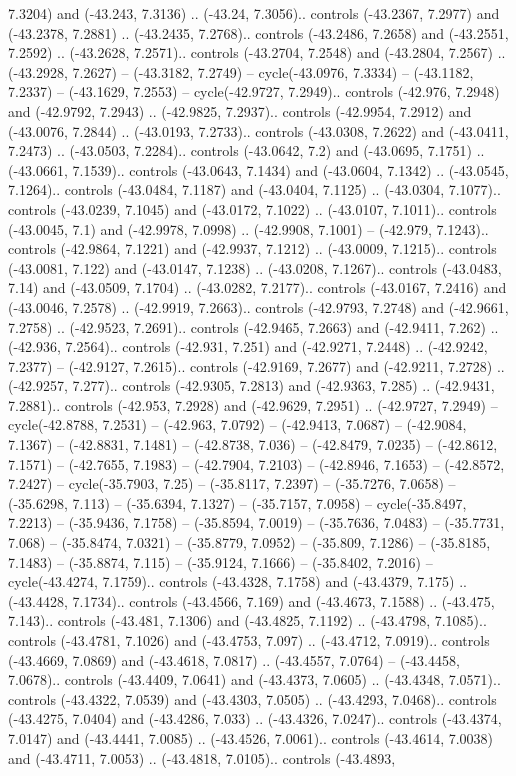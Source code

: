 \begin{scope}[shift={(2.5552, 9.9912)}]
\begin{scope}[shift={(48.1654, -14.8546)}]
7.3204) and (-43.243, 7.3136) .. (-43.24, 7.3056).. controls (-43.2367, 7.2977) and (-43.2378, 7.2881) .. (-43.2435, 7.2768).. controls (-43.2486, 7.2658) and (-43.2551, 7.2592) .. (-43.2628, 7.2571).. controls (-43.2704, 7.2548) and (-43.2804, 7.2567) .. (-43.2928, 7.2627) -- (-43.3182, 7.2749) -- cycle(-43.0976, 7.3334) -- (-43.1182, 7.2337) -- (-43.1629, 7.2553) -- cycle(-42.9727, 7.2949).. controls (-42.976, 7.2948) and (-42.9792, 7.2943) .. (-42.9825, 7.2937).. controls (-42.9954, 7.2912) and (-43.0076, 7.2844) .. (-43.0193, 7.2733).. controls (-43.0308, 7.2622) and (-43.0411, 7.2473) .. (-43.0503, 7.2284).. controls (-43.0642, 7.2) and (-43.0695, 7.1751) .. (-43.0661, 7.1539).. controls (-43.0643, 7.1434) and (-43.0604, 7.1342) .. (-43.0545, 7.1264).. controls (-43.0484, 7.1187) and (-43.0404, 7.1125) .. (-43.0304, 7.1077).. controls (-43.0239, 7.1045) and (-43.0172, 7.1022) .. (-43.0107, 7.1011).. controls (-43.0045, 7.1) and (-42.9978, 7.0998) .. (-42.9908, 7.1001) -- (-42.979, 7.1243).. controls (-42.9864, 7.1221) and (-42.9937, 7.1212) .. (-43.0009, 7.1215).. controls (-43.0081, 7.122) and (-43.0147, 7.1238) .. (-43.0208, 7.1267).. controls (-43.0483, 7.14) and (-43.0509, 7.1704) .. (-43.0282, 7.2177).. controls (-43.0167, 7.2416) and (-43.0046, 7.2578) .. (-42.9919, 7.2663).. controls (-42.9793, 7.2748) and (-42.9661, 7.2758) .. (-42.9523, 7.2691).. controls (-42.9465, 7.2663) and (-42.9411, 7.262) .. (-42.936, 7.2564).. controls (-42.931, 7.251) and (-42.9271, 7.2448) .. (-42.9242, 7.2377) -- (-42.9127, 7.2615).. controls (-42.9169, 7.2677) and (-42.9211, 7.2728) .. (-42.9257, 7.277).. controls (-42.9305, 7.2813) and (-42.9363, 7.285) .. (-42.9431, 7.2881).. controls (-42.953, 7.2928) and (-42.9629, 7.2951) .. (-42.9727, 7.2949) -- cycle(-42.8788, 7.2531) -- (-42.963, 7.0792) -- (-42.9413, 7.0687) -- (-42.9084, 7.1367) -- (-42.8831, 7.1481) -- (-42.8738, 7.036) -- (-42.8479, 7.0235) -- (-42.8612, 7.1571) -- (-42.7655, 7.1983) -- (-42.7904, 7.2103) -- (-42.8946, 7.1653) -- (-42.8572, 7.2427) -- cycle(-35.7903, 7.25) -- (-35.8117, 7.2397) -- (-35.7276, 7.0658) -- (-35.6298, 7.113) -- (-35.6394, 7.1327) -- (-35.7157, 7.0958) -- cycle(-35.8497, 7.2213) -- (-35.9436, 7.1758) -- (-35.8594, 7.0019) -- (-35.7636, 7.0483) -- (-35.7731, 7.068) -- (-35.8474, 7.0321) -- (-35.8779, 7.0952) -- (-35.809, 7.1286) -- (-35.8185, 7.1483) -- (-35.8874, 7.115) -- (-35.9124, 7.1666) -- (-35.8402, 7.2016) -- cycle(-43.4274, 7.1759).. controls (-43.4328, 7.1758) and (-43.4379, 7.175) .. (-43.4428, 7.1734).. controls (-43.4566, 7.169) and (-43.4673, 7.1588) .. (-43.475, 7.143).. controls (-43.481, 7.1306) and (-43.4825, 7.1192) .. (-43.4798, 7.1085).. controls (-43.4781, 7.1026) and (-43.4753, 7.097) .. (-43.4712, 7.0919).. controls (-43.4669, 7.0869) and (-43.4618, 7.0817) .. (-43.4557, 7.0764) -- (-43.4458, 7.0678).. controls (-43.4409, 7.0641) and (-43.4373, 7.0605) .. (-43.4348, 7.0571).. controls (-43.4322, 7.0539) and (-43.4303, 7.0505) .. (-43.4293, 7.0468).. controls (-43.4275, 7.0404) and (-43.4286, 7.033) .. (-43.4326, 7.0247).. controls (-43.4374, 7.0147) and (-43.4441, 7.0085) .. (-43.4526, 7.0061).. controls (-43.4614, 7.0038) and (-43.4711, 7.0053) .. (-43.4818, 7.0105).. controls (-43.4893, 
\end{scope}
\end{scope}
